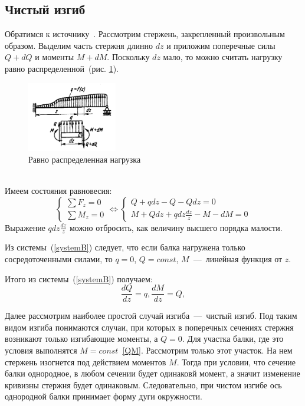 \documentclass[12pt, a4paper]{article}
\begin{document}
\subsection{Чистый изгиб}
Обратимся к источнику~\cite{Feofociev}.
Рассмотрим стержень, закрепленный произвольным образом. Выделим часть стержня длинно $dz$ и приложим поперечные силы $Q + dQ$ и моменты $M + dM$. Поскольку $dz$ мало, то можно считать нагрузку равно распределенной~(рис. \ref{pic1}).
\begin{figure}[!h]
	\centering
	\includegraphics[width=0.35\textwidth]{pic.1}%
	\caption{Равно распределенная нагрузка}
	\vspace*{-2mm}
	\label{pic1}
\end{figure}
\\Имеем состояния равновесия:  
\begin{equation}
	\label{systemB}
	\begin{cases}
	\sum\limits {{F_z = 0}} \\
	\sum\limits {{M_z = 0}}
	\end{cases}
	\Leftrightarrow
	\begin{cases}
		Q + q dz - Q - Q dz = 0 \\
		M + Q dz + q dz \frac {dz}{z} - M -dM = 0
	\end{cases}
\end{equation}
Выражение $q dz \frac {dz}{z}$ можно отбросить,
как величину высшего порядка малости.

Из системы~(\ref{systemB}) следует, что если балка нагружена только сосредоточенными силами, то $q = 0$, $Q = const$, $M$~---~линейная функция от $z$.

Итого из системы~(\ref{systemB}) получаем:
\begin{equation}
	\label{QM}
 \frac {dQ}{dz} = q, 
 \frac {dM}{dz} = Q,
\end{equation}

Далее рассмотрим наиболее простой случай изгиба~---~чистый изгиб. Под таким видом изгиба понимаются случаи, при которых в поперечных сечениях стержня возникают только изгибающие моменты, а $Q = 0$. Для участка балки, где это условия выполнятся $M = const$~\eqref{QM}. Рассмотрим только этот участок. На нем стержень изогнется под действием моментов $M$. Тогда при условии, что сечение балки однородное, в любом сечении будет одинаковй момент, а значит изменение кривизны стержня будет одинаковым. Следовательно, при чистом изгибе ось однородной балки принимает форму дуги окружности.
\end{document}

